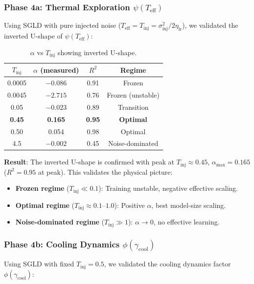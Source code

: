 \documentclass[11pt, a4paper]{article}
\theoremstyle{definition}
\begin{document}
\subsubsection{Phase 4a: Thermal Exploration $\psi(T_{\text{eff}})$}

Using SGLD with pure injected noise ($T_{\text{eff}} = T_{\text{inj}} = \sigma_{\text{inj}}^2 / 2\eta_{\text{lr}}$), we validated the inverted U-shape of $\psi(T_{\text{eff}})$:

\begin{table}[htbp]
\centering
\caption{$\alpha$ vs $T_{\text{inj}}$ showing inverted U-shape.}
\label{tab:temp_scaling}
\begin{tabular}{@{}cccc@{}}
\toprule
$T_{\text{inj}}$ & $\alpha$ (measured) & $R^2$ & \textbf{Regime} \\
\midrule
0.0005 & $-0.086$ & 0.91 & Frozen \\
0.0045 & $-2.715$ & 0.76 & Frozen (unstable) \\
0.05 & $-0.023$ & 0.89 & Transition \\
\textbf{0.45} & \textbf{0.165} & \textbf{0.95} & \textbf{Optimal} \\
0.50 & 0.054 & 0.98 & Optimal \\
4.5 & $-0.002$ & 0.45 & Noise-dominated \\
\bottomrule
\end{tabular}
\end{table}

\textbf{Result}: The inverted U-shape is confirmed with peak at $T_{\text{inj}} \approx 0.45$, $\alpha_{\text{max}} = 0.165$ ($R^2 = 0.95$ at peak). This validates the physical picture:
\begin{itemize}
    \item \textbf{Frozen regime} ($T_{\text{inj}} \ll 0.1$): Training unstable, negative effective scaling.
    \item \textbf{Optimal regime} ($T_{\text{inj}} \approx 0.1$--$1.0$): Positive $\alpha$, best model-size scaling.
    \item \textbf{Noise-dominated regime} ($T_{\text{inj}} \gg 1$): $\alpha \to 0$, no effective learning.
\end{itemize}

\subsubsection{Phase 4b: Cooling Dynamics $\phi(\gamma_{\text{cool}})$}

Using SGLD with fixed $T_{\text{inj}} = 0.5$, we validated the cooling dynamics factor $\phi(\gamma_{\text{cool}})$:
\end{document}

